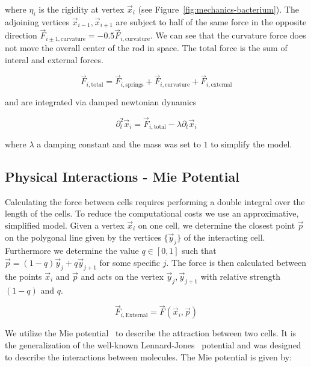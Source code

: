 \documentclass{article}
\begin{document}
where $\eta_i$ is the rigidity at vertex $\vec{x}_i$ (see Figure~\ref{fig:mechanics-bacterium}).
The adjoining vertices $\vec{x}_{i-1},\vec{x}_{i+1}$ are subject to half of the same force in the
opposite direction $\vec{F}_{i\pm 1,\text{curvature}} = -0.5\vec{F}_{i,\text{curvature}}$.
We can see that the curvature force does not move the overall center of the rod in space.
The total force is the sum of interal and external forces.

\begin{equation}
    \vec{F}_{i,\text{total}} = \vec{F}_{i,\text{springs}}+ \vec{F}_{i,\text{curvature}}
        + \vec{F}_{i,\text{external}}
\end{equation}

and are integrated via damped newtonian dynamics

\begin{equation}
    \partial_t^2 \vec{x}_i = \vec{F}_{i,\text{total}} - \lambda \partial_t\vec{x}_i
\end{equation}

where $\lambda$ a damping constant and the mass was set to $1$ to simplify the model.

\subsection{Physical Interactions - Mie Potential}

Calculating the force between cells requires performing a double integral over the length of the
cells.
To reduce the computational costs we use an approximative, simplified model.
Given a vertex $\vec{x}_i$ on one cell, we determine the closest point $\vec{p}$ on the polygonal
line given by the vertices $\{\vec{y}_j\}$ of the interacting cell.
Furthermore we determine the value $q\in[0,1]$ such that $\vec{p} = (1-q)\vec{y}_j + q\vec{y}_{j+1}$
for some specific $j$.
The force is then calculated between the points $\vec{x}_i$ and $\vec{p}$ and acts on
the vertex $\vec{y}_j,\vec{y}_{j+1}$ with relative strength $(1-q)$ and $q$.

\begin{equation}
    \vec{F}_{i,\text{External}} = \vec{F}(\vec{x}_i,\vec{p})
\end{equation}

We utilize the Mie potential~\cite{Mie1903} to describe the attraction between two cells.
It is the generalization of the well-known Lennard-Jones~\cite{Jones1924} potential and was designed
to describe the interactions between molecules.
The Mie potential is given by:
\end{document}
